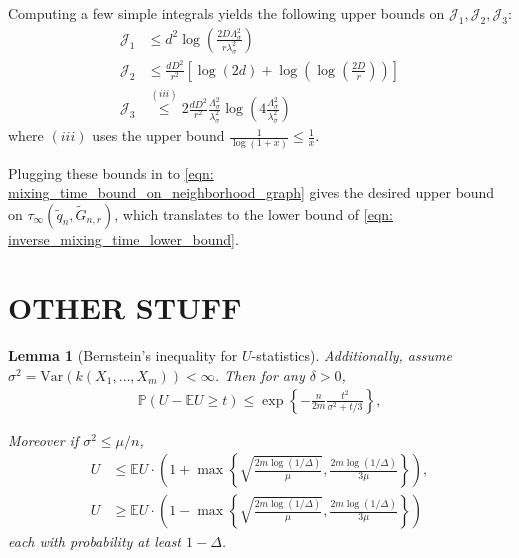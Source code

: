 \documentclass{article}
\newcommand{\1}{\mathbf{1}}
\newcommand{\var}{\mathrm{Var}}
\theoremstyle{aldenthm}
\newtheorem{lemma}{Lemma}
\begin{document}
Computing a few simple integrals yields the following upper bounds on $\mathcal{J}_1, \mathcal{J}_2, \mathcal{J}_3$:
\begin{align*}
\mathcal{J}_1 & \leq d^2 \log\left( \frac{2D\Lambda_{\sigma}^2}{r\lambda_{\sigma}^2} \right) \\
\mathcal{J}_2 & \leq \frac{dD^2}{r^2} \left[ \log\left(2d\right) + \log\left(\log\left(\frac{2D}{r}\right)\right) \right] \\
\mathcal{J}_3 & \overset{(iii)}{\leq} 2 \frac{dD^2}{r^2} \frac{\Lambda_{\sigma}^2}{\lambda_{\sigma}^2} \log\left(4 \frac{\Lambda_{\sigma}^2}{\lambda_{\sigma}^2}\right)
\end{align*}
where $(iii)$ uses the upper bound $\frac{1}{\log(1 + x)} \leq \frac{1}{x}$.

Plugging these bounds in to \eqref{eqn: mixing_time_bound_on_neighborhood_graph} gives the desired upper bound on $\tau_{\infty}(\widetilde{q}_n, \widetilde{G}_{n,r})$, which translates to the lower bound of \eqref{eqn: inverse_mixing_time_lower_bound}.





\section{OTHER STUFF}

	\begin{lemma}[Bernstein's inequality for $U$-statistics]
		\label{lem: bernstein}
		Additionally, assume $\sigma^2 = \var\left(k(X_1, \ldots, X_m) \right) < \infty$. Then for any $\delta > 0$, 
		\begin{align*}
		\mathbb{P}(U - \mathbb{E}U \geq t) \leq \exp\left\{-\frac{n}{2m}\frac{t^2}{\sigma^2 + t/3}\right\},
		\end{align*}
		
		Moreover if $\sigma^2 \leq \mu/n$, 
		\begin{align*}
		U & \leq \mathbb{E}U \cdot \left(1 + \max\left\{ \sqrt{\frac{2m\log(1/\Delta)}{\mu}}, \frac{2m \log(1/\Delta)}{3\mu} \right\}\right), \\
		U & \geq \mathbb{E}U \cdot \left(1 - \max\left\{ \sqrt{\frac{2m\log(1/\Delta)}{\mu}}, \frac{2m \log(1/\Delta)}{3\mu} \right\}\right)
		\end{align*}
		each with probability at least $1 - \Delta$.
	\end{lemma}
\end{document}
